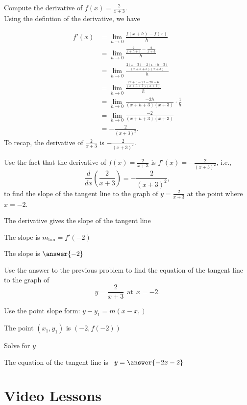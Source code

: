 \documentclass{ximera}
\begin{document}
\begin{example}[example 7]
Compute the derivative of $f(x) = \displaystyle{\frac{2}{x+3}}$.\\
Using the defintion of the derivative, we have

\begin{align*}
f'(x) &= \lim_{h \to 0} \frac{f(x+h)-f(x)}{h}\\[5pt]
&= \lim_{h \to 0} \frac{\frac{2}{x+h +3}- \frac{2}{x+3}}{h}\\[5pt]
&= \lim_{h \to 0} \frac{\frac{2(x+3) - 2(x+h+3)}{(x+h+3)(x+3)}}{h} \\[5pt]
&= \lim_{h \to 0} \frac{\frac{2x+6 - 2x-2h-6}{(x+h+3)(x+3)}}{h} \\[5pt]
&=  \lim_{h \to 0} \frac{-2h}{(x+h+3)(x+3)}\cdot \frac{1}{h}\\[5pt]
&= \lim_{h \to 0} \frac{-2}{(x+h+3)(x+3)} \\[5pt]
&= -\frac{2}{(x+3)^2}.
\end{align*}
To recap, the derivative of $\displaystyle{\frac{2}{x+3}}$ is $\displaystyle{-\frac{2}{(x+3)^2}}$.
\end{example}




\begin{problem} %
Use the fact that the derivative of $f(x) = \frac{2}{x+3}$ is $f'(x) = -\frac{2}{(x+3)^2}$,
i.e., 
\[
\frac{d}{dx}\left(\frac{2}{x+3}\right) = -\frac{2}{(x+3)^2},
\]
to find the slope of the tangent line to the graph of 
$y = \frac{2}{x+3}$ at the point where $x = -2$.\\
\begin{hint}
The derivative gives the slope of the tangent line
\end{hint}
\begin{hint}
The slope is $m_{\text{tan}} = f'(-2)$
\end{hint}
The slope is $\answer{-2}$
\end{problem}




\begin{problem} %
Use the answer to the previous problem to find the equation of the tangent line to the graph of 
\[
y = \frac{2}{x+3} \  \  \text{at} \  \ x=-2.
\]

\begin{hint}
Use the point slope form: $y-y_1 = m(x-x_1)$
\end{hint}
\begin{hint}
The point $(x_1,y_1)$ is $(-2, f(-2))$
\end{hint}
\begin{hint}
Solve for $y$
\end{hint}
The equation of the tangent line is \  $y = \answer{-2x-2}$
\end{problem}






\section{Video Lessons}

\begin{center}
\begin{foldable}
\end{foldable}
\end{center}
\end{document}
